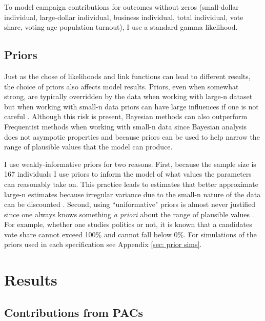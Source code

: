 \documentclass[12pt]{article}
\begin{document}
To model campaign contributions for outcomes without zeros (small-dollar individual, large-dollar individual, business individual, total individual, vote share, voting age population turnout), I use a standard gamma likelihood.

\subsection{Priors}

Just as the chose of likelihoods and link functions can lead to different results, the choice of priors also affects model results. Priors, even when somewhat strong, are typically overridden by the data when working with large-n dataset but when working with small-n data priors can have large influences if one is not careful \citep{mcneish2016}. Although this risk is present, Bayesian methods can also outperform Frequentist methods when working with small-n data since Bayesian analysis does not asympotic properties and because priors can be used to help narrow the range of plausible values that the model can produce. 

I use weakly-informative priors for two reasons. First, because the sample size is 167 individuals I use priors to inform the model of what values the parameters can reasonably take on. This practice leads to estimates that better approximate large-n estimates because irregular variance due to the small-n nature of the data can be discounted \citep{mcneish2016}. Second, using ``uniformative" priors is almost never justified since one always knows something \textit{a priori} about the range of plausible values \citep{gelman2008a}. For example, whether one studies politics or not, it is known that a candidates vote share cannot exceed 100\% and cannot fall below 0\%. For simulations of the priors used in each specification see Appendix \ref{sec: prior sims}.


\section{Results}

\subsection{Contributions from PACs}
\end{document}
